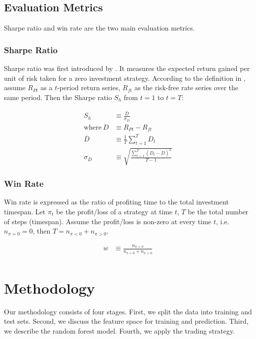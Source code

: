 \documentclass[12pt]{article}
\begin{document}
\subsection{Evaluation Metrics}

Sharpe ratio and win rate are the two main evaluation metrics.

\subsubsection{Sharpe Ratio}

Sharpe ratio was first introduced by \cite{sharpe1966}. It measures the expected return gained per unit of risk taken for a zero investment strategy. According to the definition in \cite{sharpe1994}, assume \(R_{Pt}\) as a \(t\)-period return series, \(R_{ft}\) as the risk-free rate series over the same period. Then the Sharpe ratio \(S_h\) from \(t=1\) to \(t=T\):

\begin{align*}
  S_h &\equiv \frac{\overline{D}}{\sigma_D} \\
  \text{where}~D &\equiv R_{Pt} - R_{ft} \\
  \overline{D} &\equiv \frac{1}{T} \sum_{t=1}^T D_t \\
  \sigma_D &\equiv \sqrt{\frac{\sum_{t=1}^T (D_t-\overline{D})^2}{T-1}}
\end{align*}

\subsubsection{Win Rate}

Win rate is expressed as the ratio of profiting time to the total investment timespan. Let \(\pi_t\) be the profit/loss of a strategy at time \(t\), \(T\) be the total number of steps (timespan). Assume the profit/loss is non-zero at every time \(t\), i.e. \(n_{\pi=0} = 0\), then \(T = n_{\pi<0} + n_{\pi>0}\).

\begin{align*}
  w &\equiv \frac{n_{\pi>0}}{n_{\pi<0} + n_{\pi>0}} \\
\end{align*}


\section{Methodology}

Our methodology consists of four stages. First, we split the data into training and test sets. Second, we discuss the feature space for training and prediction. Third, we describe the random forest model. Fourth, we apply the trading strategy.
\end{document}

